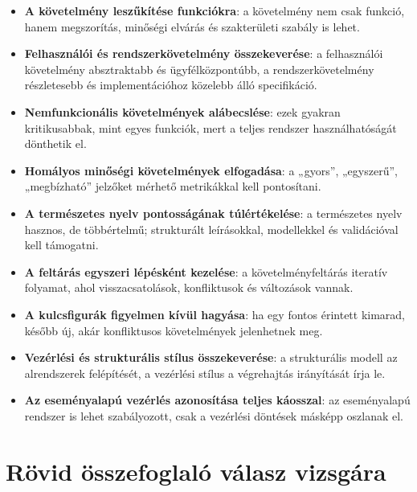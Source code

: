 \begin{warningbox}
\begin{itemize}
  \item \textbf{A követelmény leszűkítése funkciókra}: a követelmény nem csak funkció, hanem megszorítás, minőségi elvárás és szakterületi szabály is lehet.
  \item \textbf{Felhasználói és rendszerkövetelmény összekeverése}: a felhasználói követelmény absztraktabb és ügyfélközpontúbb, a rendszerkövetelmény részletesebb és implementációhoz közelebb álló specifikáció.
  \item \textbf{Nemfunkcionális követelmények alábecslése}: ezek gyakran kritikusabbak, mint egyes funkciók, mert a teljes rendszer használhatóságát dönthetik el.
  \item \textbf{Homályos minőségi követelmények elfogadása}: a „gyors”, „egyszerű”, „megbízható” jelzőket mérhető metrikákkal kell pontosítani.
  \item \textbf{A természetes nyelv pontosságának túlértékelése}: a természetes nyelv hasznos, de többértelmű; strukturált leírásokkal, modellekkel és validációval kell támogatni.
  \item \textbf{A feltárás egyszeri lépésként kezelése}: a követelményfeltárás iteratív folyamat, ahol visszacsatolások, konfliktusok és változások vannak.
  \item \textbf{A kulcsfigurák figyelmen kívül hagyása}: ha egy fontos érintett kimarad, később új, akár konfliktusos követelmények jelenhetnek meg.
  \item \textbf{Vezérlési és strukturális stílus összekeverése}: a strukturális modell az alrendszerek felépítését, a vezérlési stílus a végrehajtás irányítását írja le.
  \item \textbf{Az eseményalapú vezérlés azonosítása teljes káosszal}: az eseményalapú rendszer is lehet szabályozott, csak a vezérlési döntések másképp oszlanak el.
\end{itemize}
\end{warningbox}

\section{Rövid összefoglaló válasz vizsgára}

